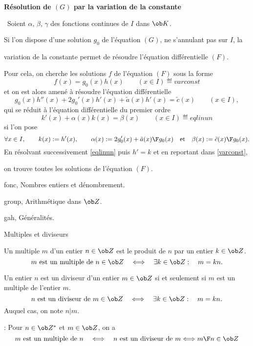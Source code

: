 \centerline{\bf Résolution de $(G)$ par la variation de la constante}
\medskip
\noindent\ Soient $\alpha$, $\beta$, $\gamma$ des fonctions continues de $I$ dans $\ob K$. 

\noindent
Si l'on dispose d'une solution $g_0$ de l'équation $(G)$, ne s'annulant pas sur $I$, 
la 

\noindent variation de la constante permet de résoudre l'équation différentielle $(F)$. 

\noindent
Pour cela, on cherche les solutions $f$ de l'équation $(F)$ sous la forme 
$$
f(x)=g_0(x)h(x)\qquad (x\in I)\eqdef{varconst}
$$
et on est alors amené à résoudre l'équation différentielle 
$$
g_0(x)h''(x)+2g_0'(x)h'(x)+\tilde a(x)h'(x)=\tilde c(x)\qquad (x\in I),
$$
qui se réduit à l'équation différentielle du premier ordre
$$
k'(x)+\alpha(x)k(x)=\beta(x)\qquad (x\in I)\eqdef{eqlinun}
$$
si l'on pose 
$$
\forall x\in I, \qquad k(x):=h'(x), \qquad\alpha(x):={2g_0'(x)+\tilde a(x)\F g_0(x)}\quad \mbox{et}\quad\beta(x):={\tilde c(x)\F g_0(x)}.
$$
\quad En résolvant successivement \eqref{eqlinun} puis $h'=k$ et en reportant dans \eqref{varconst}, 

\qquad on trouve toutes les solutions de l'équation $(F)$. 







                     



\Chapter fonc, Nombres entiers et dénombrement. 
\bigskip

\Section group, Arithmétique dans $\ob Z$. 

\Subsection gah, Généralités.

\Concept [] Multiples et diviseurs

\Definition []  Un multiple $m$ d'un entier $n\in\ob Z$ est le produit de $n$ par un entier $k\in\ob Z$.
$$
m\mbox{ est un multiple de }n\in\ob Z\quad \Longleftrightarrow\quad \exists k\in\ob Z:\quad m=kn.
$$ 

\Definition []  Un entier $n$ est un diviseur d'un entier $m\in\ob Z$ si et seulement si $m$ est un multiple de l'entier $m$. 
$$
n\mbox{ est un diviseur de }m\in\ob Z\quad \Longleftrightarrow\quad \exists k\in\ob Z:\quad m=kn.
$$ 
Auquel cas, on note $n|m$. 
\bigskip

\Remarque : Pour $n\in\ob Z^*$ et $m\in\ob Z$, on a 
$$
m\mbox{ est un multiple de }n\quad \Longleftrightarrow\quad n\mbox{ est un diviseur de }m \Longleftrightarrow {m\F n}\in\ob Z
$$
\bigskip

